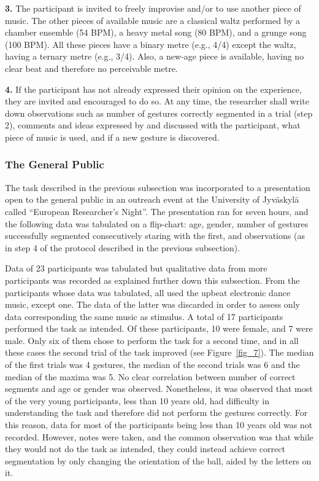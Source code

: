 \documentclass{nime-alternate_MANUSCRIPT} %
\begin{document}
\textbf{3.}	The participant is invited to freely improvise and/or to use another piece of music. The other pieces of available music are a classical waltz performed by a chamber ensemble (54 BPM), a heavy metal song (80 BPM), and a grunge song (100 BPM). All these pieces have a binary metre (e.g., 4/4) except the waltz, having a ternary metre (e.g., 3/4). Also, a new-age piece is available, having no clear beat and therefore no perceivable metre. 

\textbf{4.}	If the participant has not already expressed their opinion on the experience, they are invited and encouraged to do so. At any time, the researcher shall write down observations such as number of gestures correctly segmented in a trial (step 2), comments and ideas expressed by and discussed with the participant, what piece of music is used, and if a new gesture is discovered.

\subsubsection{The General Public}

The task described in the previous subsection was incorporated to a presentation open to the general public in an outreach event at the 
University of Jyväskylä called “European Researcher’s Night”. 
The presentation ran for seven hours, and the following data was tabulated on a flip-chart: age, gender, number of gestures successfully segmented consecutively staring with the first, and observations (as in step 4 of the protocol described in the previous subsection).

Data of 23 participants was tabulated but qualitative data from more participants was recorded as explained further down this subsection. From the participants whose data was tabulated, all used the upbeat electronic dance music, except one. The data of the latter was discarded in order to assess only data corresponding the same music as stimulus. A total of 17 participants performed the task as intended. Of these participants, 10 were female, and 7 were male. Only six of them chose to perform the task for a second time, and in all these cases the second trial of the task improved (see Figure~\ref{fig_7}). The median of the first trials was 4 gestures, the median of the second trials was 6 and the median of the maxima was 5. No clear correlation between number of correct segments and age or gender was observed. Nonetheless, it was observed that most of the very young participants, less than 10 years old, had difficulty in understanding the task and therefore did not perform the gestures correctly. For this reason, data for most of the participants being less than 10 years old was not recorded. However, notes were taken, and the common observation was that while they would not do the task as intended, they could instead achieve correct segmentation by only changing the orientation of the ball, aided by the letters on it.
\end{document}
